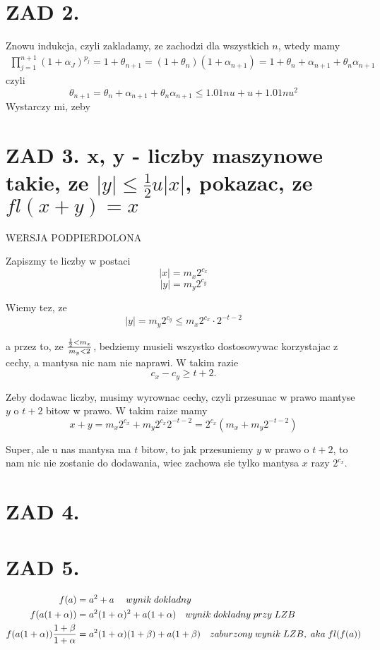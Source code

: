 \documentclass{article}[13pt]
\begin{document}
    \section*{ZAD 2.}

    Znowu indukcja, czyli zakladamy, ze zachodzi dla wszystkich $n$, wtedy mamy
    \begin{align*}
        \prod\limits_{j=1}^{n+1}(1+\alpha_J)^{p_j}=1+\theta_{n+1}=(1+\theta_n)(1+\alpha_{n+1})=1+\theta_n+\alpha_{n+1}+\theta_n\alpha_{n+1}
    \end{align*}
    czyli
    $$\theta_{n+1}=\theta_n+\alpha_{n+1}+\theta_n\alpha_{n+1}\leq1.01nu+u+1.01nu^2$$
    Wystarczy mi, zeby



    \section*{ZAD 3. x, y - liczby maszynowe takie, ze $|y|\leq \frac12 u|x|$, pokazac, ze $fl(x+y)=x$}

    WERSJA PODPIERDOLONA
    \medskip

    Zapiszmy te liczby w postaci
    $$|x|=m_x2^{c_x}$$
    $$|y|=m_y2^{c_y}$$

    Wiemy tez, ze
    $$|y|=m_y2^{c_y}\leq m_x2^{c_x}\cdot 2^{-t-2}$$

    a przez to, ze $\frac12<{m_x}\over m_y<2$, bedziemy musieli wszystko dostosowywac korzystajac z cechy, a mantysa nic nam nie naprawi. W takim razie
    $$c_x-c_y\geq t+2.$$
    
    Zeby dodawac liczby, musimy wyrownac cechy, czyli przesunac w prawo mantyse $y$ o $t+2$ bitow w prawo. W takim raize mamy
    $$x+y=m_x2^{c_x}+m_y2^{c_x}2^{-t-2}=2^{c_x}(m_x+m_y2^{-t-2})$$

    Super, ale u nas mantysa ma $t$ bitow, to jak przesuniemy $y$ w prawo o $t+2$, to nam nic nie zostanie do dodawania, wiec zachowa sie tylko mantysa $x$ razy $2^{c_x}$.

    \section*{ZAD 4.}



    \section*{ZAD 5.}

    \begin{align*}
        f(a)&=a^2+a\quad\;wynik\;dokladny\\
        f(a(1+\alpha))&=a^2(1+\alpha)^2+a(1+\alpha)\quad wynik\;dokladny\;przy\;LZB\\
        f(a(1+\alpha)){1+\beta\over 1+\alpha}&=a^2(1+\alpha)(1+\beta)+a(1+\beta)\quad zaburzony \;wynik\; LZB,\;aka\;fl(f(a))
    \end{align*}
\end{document}
